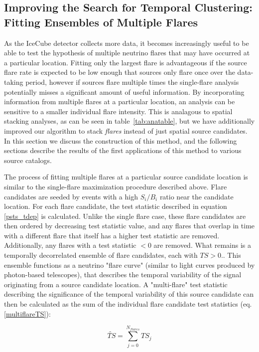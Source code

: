 \subsection{Improving the Search for Temporal Clustering: Fitting Ensembles of Multiple Flares}
As the IceCube detector collects more data, it becomes increasingly useful to be able to test the hypothesis of multiple neutrino flares that may have occurred at a particular location. Fitting only the largest flare is advantageous if the source flare rate is expected to be low enough that sources only flare once over the data-taking period, however if sources flare multiple times the single-flare analysis potentially misses a significant amount of useful information. By incorporating information from multiple flares at a particular location, an analysis can be sensitive to a smaller individual flare intensity. This is analagous to spatial stacking analyses, as can be seen in table~\ref{tab:anatable}, but we have additionally improved our algorithm to stack \textit{flares} instead of just spatial source candidates. In this section we discuss the construction of this method, and the following sections describe the results of the first applications of this method to various source catalogs. 

The process of fitting multiple flares at a particular source candidate location is similar to the single-flare maximization procedure described above. Flare candidates are seeded by events with a high $S_i/B_i$ ratio near the candidate location. For each flare candidate, the test statistic described in equation \ref{psts_tdep} is calculated. Unlike the single flare case, these flare candidates are then ordered by decreasing test statistic value, and any flares that overlap in time with a different flare that itself has a higher test statistic are removed. Additionally, any flares with a test statistic $< 0$ are removed. What remains is a temporally decorrelated ensemble of flare candidates, each with $TS>0.$. This ensemble functions as a neutrino "flare curve" (similar to light curves produced by photon-based telescopes), that describes the temporal variability of the signal originating from a source candidate location. A "multi-flare" test statistic describing the significance of the temporal variability of this source candidate can then be calculated as the sum of the individual flare candidate test statistics (eq. \ref{multiflareTS}):

\begin{equation}
    \widetilde{TS} = \sum_{j=0}^{N_{flares}} TS_{j}
    \label{multiflareTS}
\end{equation}

